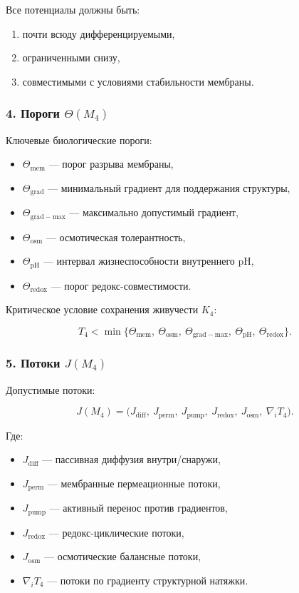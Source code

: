 Все потенциалы должны быть:

\begin{enumerate}
    \item почти всюду дифференцируемыми,
    \item ограниченными снизу,
    \item совместимыми с условиями стабильности мембраны.
\end{enumerate}

\subsubsection*{4. Пороги \texorpdfstring{$\Theta(M_4)$}{\Theta(M_4)}}

Ключевые биологические пороги:

\begin{itemize}
    \item $\Theta_{\mathrm{mem}}$ — порог разрыва мембраны,
    \item $\Theta_{\mathrm{grad}}$ — минимальный градиент для поддержания структуры,
    \item $\Theta_{\mathrm{grad-max}}$ — максимально допустимый градиент,
    \item $\Theta_{\mathrm{osm}}$ — осмотическая толерантность,
    \item $\Theta_{\mathrm{pH}}$ — интервал жизнеспособности внутреннего pH,
    \item $\Theta_{\mathrm{redox}}$ — порог редокс-совместимости.
\end{itemize}

Критическое условие сохранения живучести $K_4$:

\[
T_4 <
\min\{
\Theta_{\mathrm{mem}},\
\Theta_{\mathrm{osm}},\
\Theta_{\mathrm{grad-max}},\
\Theta_{\mathrm{pH}},\
\Theta_{\mathrm{redox}}
\}.
\]

\subsubsection*{5. Потоки \texorpdfstring{$J(M_4)$}{J(M_4)}}

Допустимые потоки:

\[
J(M_4)
=
\big(
J_{\mathrm{diff}},\
J_{\mathrm{perm}},\
J_{\mathrm{pump}},\
J_{\mathrm{redox}},\
J_{\mathrm{osm}},\
\nabla_i T_4
\big).
\]

Где:

\begin{itemize}
    \item $J_{\mathrm{diff}}$ — пассивная диффузия внутри/снаружи,
    \item $J_{\mathrm{perm}}$ — мембранные пермеационные потоки,
    \item $J_{\mathrm{pump}}$ — активный перенос против градиентов,
    \item $J_{\mathrm{redox}}$ — редокс-циклические потоки,
    \item $J_{\mathrm{osm}}$ — осмотические балансные потоки,
    \item $\nabla_i T_4$ — потоки по градиенту структурной натяжки.
\end{itemize}

